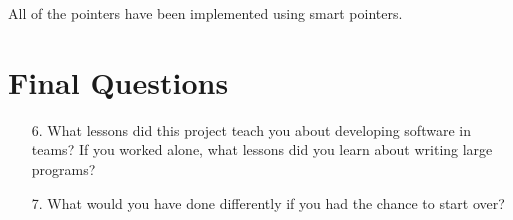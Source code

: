\documentclass[12pt]{article}
\begin{document}
All of the pointers have been implemented using smart pointers. 

\section*{Final Questions}

\begin{enumerate}
\item[6.] What lessons did this project teach you about developing software in teams? If you worked alone, what lessons did you learn about writing large programs?
\item[7.] What would you have done differently if you had the chance to start over?
\end{enumerate}
\end{document}

